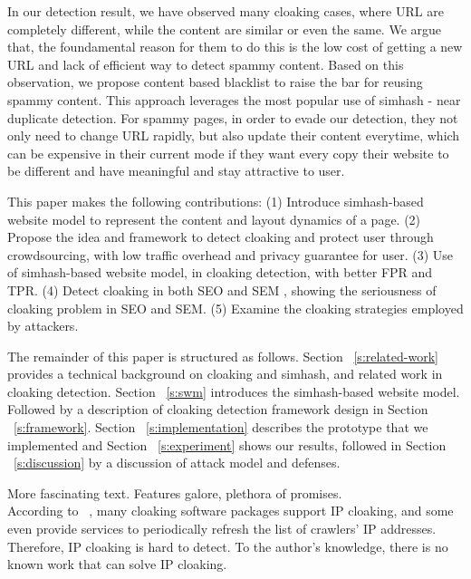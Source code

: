 In our detection result, we have observed many cloaking cases, where URL are
completely different, while the content are similar or even the same.
We argue that, the foundamental reason for them to do this is the low cost of
getting a new URL and lack of efficient way to detect spammy content.
Based on this observation, we propose content based blacklist to raise the bar
for reusing spammy content. This approach leverages the most popular use of
simhash - near duplicate detection. For spammy pages, in order to evade our
detection, they not only need to change URL rapidly, but also update their
content everytime, which can be expensive in their current mode if they want
every copy their website to be different and have meaningful and stay attractive
to user.


This paper makes the following contributions:
(1) Introduce simhash-based website model to represent the content and layout
dynamics of a page.
(2) Propose the idea and framework to detect cloaking and protect user through crowdsourcing,
with low traffic overhead and privacy guarantee for user.
(3) Use of simhash-based website model, in cloaking detection, with better FPR
and TPR.
(4) Detect cloaking in both SEO and SEM , showing the seriousness of cloaking
problem in SEO and SEM.
(5) Examine the cloaking strategies employed by attackers.


The remainder of this paper is structured as follows. Section
~\autoref{s:related-work} provides a
technical background on cloaking and simhash, and related work in cloaking
detection. Section ~\autoref{s:swm} introduces the simhash-based website model.
Followed by a description of cloaking detection framework design in 
Section ~\autoref{s:framework}. Section ~\autoref{s:implementation} describes the 
prototype that we implemented and Section ~\autoref{s:experiment} shows our results,
followed in  Section ~\autoref{s:discussion} by a discussion of attack
model and defenses.



More fascinating text. Features galore, plethora of promises.\\


According to ~\cite{lin2009detection}, many cloaking software packages support
IP cloaking, and some even provide services to periodically refresh the list of
crawlers’ IP addresses. Therefore, IP cloaking is hard to detect. To the
author's knowledge, there is no known work that can solve IP
cloaking.


